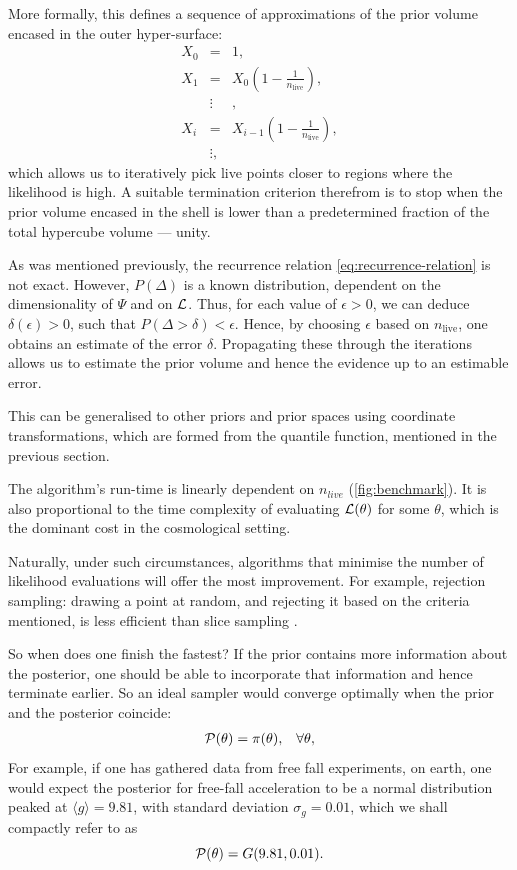 \documentclass[usenatbib]{mnras}
\begin{document}
More formally, this defines a sequence of approximations of the
prior volume encased in the outer hyper-surface:
\begin{equation}
  \begin{array}{rcl}
  X_{0} &=  &1, \\
  X_{1} &= &X_{0} \left(1- \frac{1}{n_\text{live}}\right),\\
  & \vdots &, \\
  X_{i} &= &X_{i-1}\left(1- \frac{1}{n_\text{live}}\right),\\
  & \vdots, &
\end{array}
\label{eq:recurrence-relation}
\end{equation}
which allows us to iteratively pick live points closer to
regions where the likelihood is high. A suitable termination
criterion therefrom is to stop when the prior volume encased in the
shell is lower than a predetermined fraction of the total hypercube
volume --- unity.

As was mentioned previously, the recurrence relation
\eqref{eq:recurrence-relation} is not exact. However, \(P(\Delta)\) is
a known distribution, dependent on the dimensionality of \(\Psi\) and
on \({\cal L}\). Thus, for each value of \(\epsilon>0\), we can deduce
\(\delta(\epsilon) >0\), such that \(P(\Delta > \delta) <
   \epsilon\). Hence, by choosing \(\epsilon\) based on \(n_\text{live}\),
one obtains an estimate of the error \(\delta\). Propagating these
through the iterations allows us to estimate the prior volume and
hence the evidence up to an estimable error.

This can be generalised to other priors and prior spaces using
coordinate transformations, which are formed from the
quantile function, mentioned in the previous section.

The algorithm's run-time is linearly dependent on \(n_{live}\)
(\autoref{fig:benchmark}). It is also proportional to the time
complexity of evaluating \({\cal L}(\theta)\) for some \(\theta\),
which is the dominant cost in the cosmological setting.

Naturally, under such circumstances, algorithms that minimise the
number of likelihood evaluations will offer the most
improvement. For example, rejection sampling: drawing a point at
random, and rejecting it based on the criteria mentioned, is less
efficient than slice sampling \citep{Neal_2003}.

So when does one finish the fastest? If the prior contains more
information about the posterior, one should be able to incorporate
that information and hence terminate earlier.  So an ideal sampler
would converge optimally when the prior and the posterior coincide:
   \begin{equation}
\begin{array}{rl} {\cal P}(\theta) = \pi(\theta), & \forall \theta,
   \end{array}
   \end{equation}
For example, if one has gathered data from free fall experiments,
on earth, one would expect the posterior for free-fall acceleration
to be a normal distribution peaked at \(\langle g \rangle=9.81\), with standard
deviation \(\sigma_{g} = 0.01\), which we shall compactly refer to as
\[{\cal P}(\theta) = G(9.81, 0.01).\]
\end{document}
